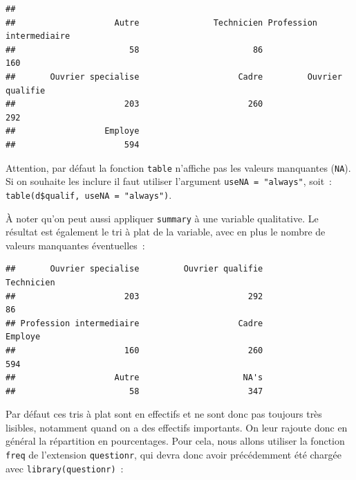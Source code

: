 \documentclass[
  12pt,
]{book}
\makeatletter
\newenvironment{Shaded}{\begin{snugshade}}{\end{snugshade}}
\newcommand{\KeywordTok}[1]{\textcolor[rgb]{0.13,0.29,0.53}{\textbf{#1}}}
\newcommand{\NormalTok}[1]{#1}
\newcommand{\OperatorTok}[1]{\textcolor[rgb]{0.81,0.36,0.00}{\textbf{#1}}}
\newcommand{\StringTok}[1]{\textcolor[rgb]{0.31,0.60,0.02}{#1}}
\newenvironment{kframe}{%
\medskip{}
\setlength{\fboxsep}{.8em}
\def\at@end@of@kframe{}%
\ifinner\ifhmode%
 \def\at@end@of@kframe{\end{minipage}}%
 \begin{minipage}{\columnwidth}%
\fi\fi%
\def\FrameCommand##1{\hskip\@totalleftmargin \hskip-\fboxsep
\colorbox{incolor}{##1}\hskip-\fboxsep
    \hskip-\linewidth \hskip-\@totalleftmargin \hskip\columnwidth}%
\MakeFramed {\advance\hsize-\width
  \@totalleftmargin\z@ \linewidth\hsize
  \@setminipage}}%
{\par\unskip\endMakeFramed%
\at@end@of@kframe}
\newenvironment{rmdblock}[1]
 {
 \begin{itemize}
 \renewcommand{\labelitemi}{
   \raisebox{-.7\height}[0pt][0pt]{
     {\setkeys{Gin}{width=3em,keepaspectratio}\texttt{[image: images/\#1]}}
   }
 }
 \begin{kframe}
 \setlength{\fboxsep}{1em}
 \item
 }
 {
 \end{kframe}
 \end{itemize}
 }
\newenvironment{rmdimportant}
  {\begin{rmdblock}{important}}
  {\end{rmdblock}}
\makeatother
\begin{document}
\begin{Shaded}
\end{Shaded}

\begin{verbatim}
## 
##                    Autre               Technicien Profession intermediaire 
##                       58                       86                      160 
##       Ouvrier specialise                    Cadre         Ouvrier qualifie 
##                      203                      260                      292 
##                  Employe 
##                      594
\end{verbatim}

\begin{rmdimportant}
Attention, par défaut la fonction \texttt{table} n'affiche pas les valeurs manquantes (\texttt{NA}). Si on souhaite les inclure il faut utiliser l'argument \texttt{useNA\ =\ "always"}, soit~: \texttt{table(d\$qualif,\ useNA\ =\ "always")}.
\end{rmdimportant}

À noter qu'on peut aussi appliquer \texttt{summary} à une variable qualitative. Le résultat est également le tri à plat de la variable, avec en plus le nombre de valeurs manquantes éventuelles~:

\begin{Shaded}
\end{Shaded}

\begin{verbatim}
##       Ouvrier specialise         Ouvrier qualifie               Technicien 
##                      203                      292                       86 
## Profession intermediaire                    Cadre                  Employe 
##                      160                      260                      594 
##                    Autre                     NA's 
##                       58                      347
\end{verbatim}

Par défaut ces tris à plat sont en effectifs et ne sont donc pas toujours très lisibles, notamment quand on a des effectifs importants. On leur rajoute donc en général la répartition en pourcentages. Pour cela, nous allons utiliser la fonction \texttt{freq} de l'extension \texttt{questionr}, qui devra donc avoir précédemment été chargée avec \texttt{library(questionr)}~:
\end{document}
